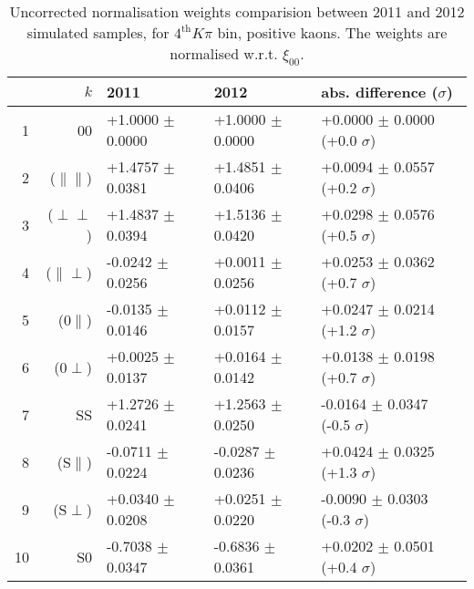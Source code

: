 \begin{table}[hbtp]
  \caption{\small Uncorrected normalisation weights comparision between 2011 and 2012 simulated samples, for $4^{\text{th}}K\pi$ bin, positive kaons. The weights are normalised w.r.t. $\xi_{00}$.}
  \center\footnotesize
  \begin{tabular}{r r l l l}      
  \multicolumn{2}{r}{$k$}    & 2011             & 2012              &   abs. difference ($\sigma$)        \\
   \hline
  1  & 00                    & +1.0000 $\pm$  0.0000  &  +1.0000 $\pm$  0.0000  &  +0.0000 $\pm$  0.0000 (+0.0 $\sigma$) \\
  2  & ($\parallel\parallel$)& +1.4757 $\pm$  0.0381  &  +1.4851 $\pm$  0.0406  &  +0.0094 $\pm$  0.0557 (+0.2 $\sigma$) \\
  3  & ($\perp\perp$)        & +1.4837 $\pm$  0.0394  &  +1.5136 $\pm$  0.0420  &  +0.0298 $\pm$  0.0576 (+0.5 $\sigma$) \\
  4  & ($\parallel\perp$)    & -0.0242 $\pm$  0.0256  &  +0.0011 $\pm$  0.0256  &  +0.0253 $\pm$  0.0362 (+0.7 $\sigma$) \\
  5  & ($0\parallel$)        & -0.0135 $\pm$  0.0146  &  +0.0112 $\pm$  0.0157  &  +0.0247 $\pm$  0.0214 (+1.2 $\sigma$) \\
  6  & ($0\perp$)            & +0.0025 $\pm$  0.0137  &  +0.0164 $\pm$  0.0142  &  +0.0138 $\pm$  0.0198 (+0.7 $\sigma$) \\
  7  & SS                    & +1.2726 $\pm$  0.0241  &  +1.2563 $\pm$  0.0250  &  -0.0164 $\pm$  0.0347 (-0.5 $\sigma$) \\
  8  & (S$\parallel$)        & -0.0711 $\pm$  0.0224  &  -0.0287 $\pm$  0.0236  &  +0.0424 $\pm$  0.0325 (+1.3 $\sigma$) \\
  9  & (S$\perp$)            & +0.0340 $\pm$  0.0208  &  +0.0251 $\pm$  0.0220  &  -0.0090 $\pm$  0.0303 (-0.3 $\sigma$) \\
  10 & S0                    & -0.7038 $\pm$  0.0347  &  -0.6836 $\pm$  0.0361  &  +0.0202 $\pm$  0.0501 (+0.4 $\sigma$) \\
\hline
\end{tabular}
\end{table}
\clearpage
